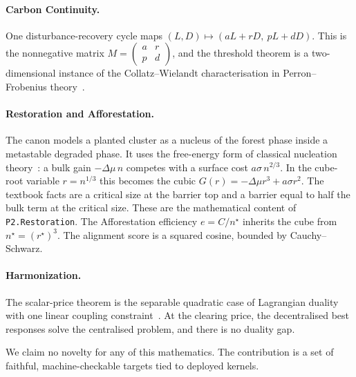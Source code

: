 \documentclass[11pt]{article}
\theoremstyle{definition}
\theoremstyle{remark}
\begin{document}
\paragraph{Carbon Continuity.} One disturbance-recovery cycle maps $(L,D)\mapsto(aL+rD,\ pL+dD)$.
This is the nonnegative matrix $M=\begin{pmatrix}a&r\\p&d\end{pmatrix}$, and the threshold theorem is a
two-dimensional instance of the Collatz--Wielandt characterisation in Perron--Frobenius theory~\cite{BermanPlemmons1994}.

\paragraph{Restoration and Afforestation.} The canon models a planted cluster as a nucleus of the forest phase inside a
metastable degraded phase. It uses the free-energy form of classical nucleation theory~\cite{Kashchiev2000}:
a bulk gain $-\Delta\mu\, n$ competes with a surface cost $a\sigma\, n^{2/3}$.
In the cube-root variable $r=n^{1/3}$ this becomes the cubic $G(r)=-\Delta\mu r^3+a\sigma r^2$.
The textbook facts are a critical size at the barrier top and a barrier equal to half the bulk term at the critical size.
These are the mathematical content of \texttt{P2.Restoration}.
The Afforestation efficiency $e=C/n^\star$ inherits the cube from $n^\star=(r^\star)^3$.
The alignment score is a squared cosine, bounded by Cauchy--Schwarz.

\paragraph{Harmonization.} The scalar-price theorem is the separable quadratic case of Lagrangian duality with
one linear coupling constraint~\cite{BoydVandenberghe2004}.
At the clearing price, the decentralised best responses solve the centralised problem, and there is no duality gap.

We claim no novelty for any of this mathematics. The contribution is a set of faithful, machine-checkable targets tied
to deployed kernels.
\end{document}
